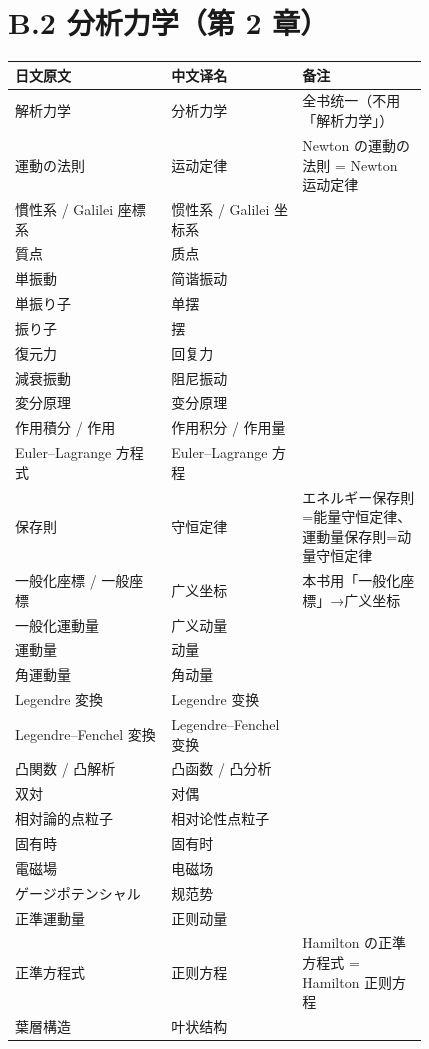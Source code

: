 \section*{B.2 分析力学（第 2 章）}
{\small
\begin{longtable}{p{0.31\linewidth} p{0.26\linewidth} p{0.25\linewidth}}
\toprule
日文原文 & 中文译名 & 备注 \\
\midrule
\endhead
解析力学 & 分析力学 & 全书统一（不用「解析力学」） \\
運動の法則 & 运动定律 & Newton の運動の法則 = Newton 运动定律 \\
慣性系 / Galilei 座標系 & 惯性系 / Galilei 坐标系 &  \\
質点 & 质点 &  \\
単振動 & 简谐振动 &  \\
単振り子 & 单摆 &  \\
振り子 & 摆 &  \\
復元力 & 回复力 &  \\
減衰振動 & 阻尼振动 &  \\
変分原理 & 变分原理 &  \\
作用積分 / 作用 & 作用积分 / 作用量 &  \\
Euler–Lagrange 方程式 & Euler–Lagrange 方程 &  \\
保存則 & 守恒定律 & エネルギー保存則=能量守恒定律、運動量保存則=动量守恒定律 \\
一般化座標 / 一般座標 & 广义坐标 & 本书用「一般化座標」→广义坐标 \\
一般化運動量 & 广义动量 &  \\
運動量 & 动量 &  \\
角運動量 & 角动量 &  \\
Legendre 変換 & Legendre 变换 &  \\
Legendre–Fenchel 変換 & Legendre–Fenchel 变换 &  \\
凸関数 / 凸解析 & 凸函数 / 凸分析 &  \\
双対 & 对偶 &  \\
相対論的点粒子 & 相对论性点粒子 &  \\
固有時 & 固有时 &  \\
電磁場 & 电磁场 &  \\
ゲージポテンシャル & 规范势 &  \\
正準運動量 & 正则动量 &  \\
正準方程式 & 正则方程 & Hamilton の正準方程式 = Hamilton 正则方程 \\
葉層構造 & 叶状结构 &  \\

\end{longtable}}

